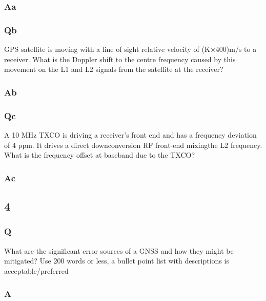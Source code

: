 \documentclass[11pt]{article}
\begin{document}
\subsubsection{Aa}



\subsubsection{Qb}
GPS satellite is moving with a line of sight relative velocity of (K×400)m/s to a receiver.  What is the Doppler shift to the centre frequency caused by this movement on the L1 and L2 signals from the satellite at the receiver?
\subsubsection{Ab}



\subsubsection{Qc}
A 10 MHz TXCO is driving a receiver’s front end and has a frequency deviation of 4 ppm.  It drives a direct downconversion RF front-end mixingthe L2 frequency.  What is the frequency offset at baseband due to the TXCO?
\subsubsection{Ac}



\subsection{4}

\subsubsection{Q}
What are the significant error sources of a GNSS and how they might be mitigated?  Use 200 words or less, a bullet point list with descriptions is acceptable/preferred
\subsubsection{A}



\end{document}
